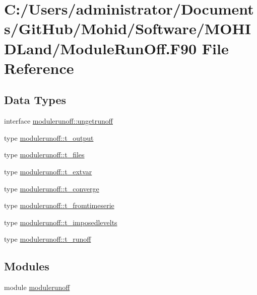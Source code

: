 \hypertarget{_module_run_off_8_f90}{}\section{C\+:/\+Users/administrator/\+Documents/\+Git\+Hub/\+Mohid/\+Software/\+M\+O\+H\+I\+D\+Land/\+Module\+Run\+Off.F90 File Reference}
\label{_module_run_off_8_f90}
\subsection*{Data Types}
\begin{DoxyCompactItemize}
\item 
interface \mbox{\hyperlink{interfacemodulerunoff_1_1ungetrunoff}{modulerunoff\+::ungetrunoff}}
\item 
type \mbox{\hyperlink{structmodulerunoff_1_1t__output}{modulerunoff\+::t\+\_\+output}}
\item 
type \mbox{\hyperlink{structmodulerunoff_1_1t__files}{modulerunoff\+::t\+\_\+files}}
\item 
type \mbox{\hyperlink{structmodulerunoff_1_1t__extvar}{modulerunoff\+::t\+\_\+extvar}}
\item 
type \mbox{\hyperlink{structmodulerunoff_1_1t__converge}{modulerunoff\+::t\+\_\+converge}}
\item 
type \mbox{\hyperlink{structmodulerunoff_1_1t__fromtimeserie}{modulerunoff\+::t\+\_\+fromtimeserie}}
\item 
type \mbox{\hyperlink{structmodulerunoff_1_1t__imposedlevelts}{modulerunoff\+::t\+\_\+imposedlevelts}}
\item 
type \mbox{\hyperlink{structmodulerunoff_1_1t__runoff}{modulerunoff\+::t\+\_\+runoff}}
\end{DoxyCompactItemize}
\subsection*{Modules}
\begin{DoxyCompactItemize}
\item 
module \mbox{\hyperlink{namespacemodulerunoff}{modulerunoff}}
\end{DoxyCompactItemize}
